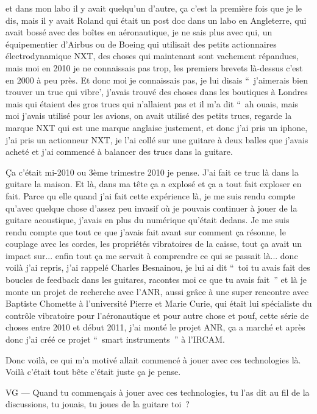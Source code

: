 et dans mon labo il y avait quelqu'un d'autre, ça c'est la première fois que je le dis, mais il y avait Roland qui était un post doc dans un labo en Angleterre, qui avait bossé avec des boîtes en aéronautique, je ne sais plus avec qui, un équipementier d'Airbus ou de Boeing qui utilisait des petits actionnaires électrodynamique NXT, des choses qui maintenant sont vachement répandues, mais moi en 2010 je ne connaissais pas trop, les premiers brevets là-dessus c'est en 2000 à peu près. Et donc moi je connaissais pas, je lui disais “ j'aimerais bien trouver un truc qui vibre', j'avais trouvé des choses dans les boutiques à Londres mais qui étaient des gros trucs qui n'allaient pas et il m'a dit “ ah ouais, mais moi j'avais utilisé pour les avions, on avait utilisé des petits trucs, regarde la marque NXT qui est une marque anglaise justement, et donc j'ai pris un iphone, j'ai pris un actionneur NXT, je l'ai collé sur une guitare à deux balles que j'avais acheté et j'ai commencé à balancer des trucs dans la guitare. 

Ça c'était mi-2010 ou 3ème trimestre 2010 je pense. J'ai fait ce truc là dans la guitare la maison. Et là, dans ma tête ça a explosé et ça a tout fait exploser en fait. Parce qu elle quand j'ai fait cette expérience là, je me suis rendu compte qu'avec quelque chose d'assez peu invasif où je pouvais continuer à jouer de la guitare acoustique, j'avais en plus du numérique qu'était dedans. Je me suis rendu compte que tout ce que j'avais fait avant sur comment ça résonne, le couplage avec les cordes, les propriétés vibratoires de la caisse, tout ça avait un impact sur... enfin tout ça me servait à comprendre ce qui se passait là... donc voilà j'ai repris, j'ai rappelé Charles Besnainou, je lui ai dit “ toi tu avais fait des boucles de feedback dans les guitares, racontes moi ce que tu avais fait ” et là je monte un projet de recherche avec l'ANR, aussi grâce à une super rencontre avec Baptiste Chomette à l'université Pierre et Marie Curie, qui était lui spécialiste du contrôle vibratoire pour l'aéronautique et pour autre chose et pouf, cette série de choses entre 2010 et début 2011, j'ai monté le projet ANR, ça a marché et après donc j'ai créé ce projet “ smart instruments ” à l'IRCAM. 

Donc voilà, ce qui m'a motivé allait commencé à jouer avec ces technologies là. Voilà c'était tout bête c'était juste ça je pense. 

VG — Quand tu commençais à jouer avec ces technologies, tu l'as dit au fil de la discussions, tu jouais, tu joues de la guitare toi ? 

